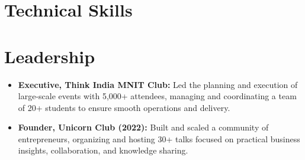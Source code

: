 \documentclass{resume}
\begin{document}
\section{Technical Skills}
\begin{itemize}
\end{itemize}

\section{Leadership}
\begin{itemize}
  \item \textbf{Executive, Think India MNIT Club:} Led the planning and execution of large-scale events with 5,000+ attendees, managing and coordinating a team of 20+ students to ensure smooth operations and delivery.
  \item \textbf{Founder, Unicorn Club (2022):} Built and scaled a community of entrepreneurs, organizing and hosting 30+ talks focused on practical business insights, collaboration, and knowledge sharing.
\end{itemize}
\end{document}
